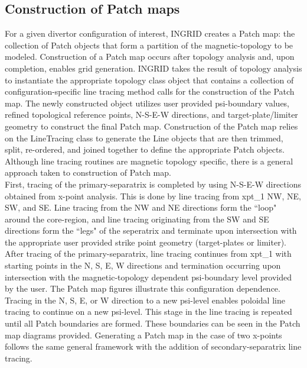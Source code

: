 \subsection{Construction of Patch maps}
For a given divertor configuration of interest, INGRID creates a Patch map: the collection of Patch objects that form a partition of the magnetic-topology to be modeled. Construction of a Patch map occurs after topology analysis and, upon completion, enables grid generation. INGRID takes the result of topology analysis to instantiate the appropriate topology class object that contains a collection of configuration-specific line tracing method calls for the construction of the Patch map. The newly constructed object  utilizes user provided psi-boundary values, refined topological reference points, N-S-E-W directions, and target-plate/limiter geometry to construct the final Patch map. Construction of the Patch map relies on the LineTracing class to generate the Line objects that are then trimmed, split, re-ordered, and joined together to define the appropriate Patch objects. Although line tracing routines are magnetic topology specific, there is a general approach taken to construction of Patch map.\\
First, tracing of the primary-separatrix is completed by using N-S-E-W directions obtained from x-point analysis. This is done by line tracing from xpt\_1 NW, NE, SW, and SE. Line tracing from the NW and NE directions form the ``loop" around the core-region, and line tracing originating from the SW and SE directions form the ``legs" of the seperatrix and terminate upon intersection with the appropriate user provided strike point geometry (target-plates or limiter). \\
After tracing of the primary-separatrix, line tracing continues from xpt\_1 with starting points in the N, S, E, W directions and termination occurring upon intersection with the magnetic-topology dependent psi-boundary level provided by the user. The Patch map figures illustrate this configuration dependence. Tracing in the N, S, E, or W direction to a new psi-level enables poloidal line tracing to continue on a new psi-level. This stage in the line tracing is repeated until all Patch boundaries are formed. These boundaries can be seen in the Patch map diagrams provided. Generating a Patch map in the case of two x-points follows the same general framework with the addition of secondary-separatrix line tracing.
